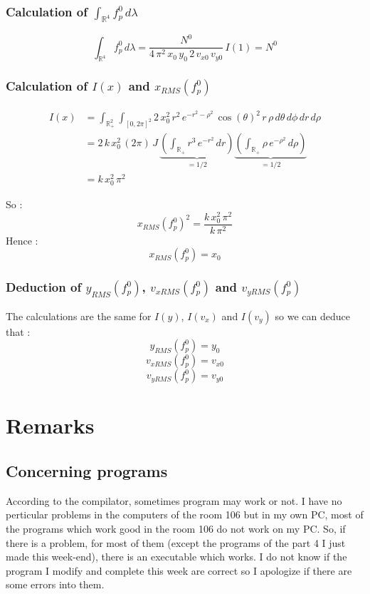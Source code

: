 \documentclass[10pt]{article}
\begin{document}
\subsubsection{Calculation of $\int_{\mathbb{R}^4}f_p^0\,d\lambda$}

$$\boxed{\int_{\mathbb{R}^4}f_p^0\,d\lambda = \frac{N^0}{4\,\pi^{2}\,x_0\,y_0\,2\,v_{x0}\,v_{y0}}\,I(1) = N^0}$$

\subsubsection{Calculation of $I(x)$ and $x_{RMS}(f_p^0)$}

\begin{align*}
I(x) &= \int_{\mathbb{R}_{+}^2}\int_{[0,2\pi]^2}  2\,x_0^2\,r^2\, e^{-r^2-\rho^{2}}\,\cos(\theta)^2\,r\,\rho\,d\theta\,d\phi\,dr\,d\rho \\
&= 2\,k\,x_0^2\,(2\pi)\,J\,\underbrace{\left(\int_{\mathbb{R}_{+}} r^3\,e^{-r^2}\,dr\right)}_{= 1/2} \underbrace{\left(\int_{\mathbb{R}_{+}}\rho\,e^{-\rho^{2}}\,d\rho \right)}_{= 1/2} \\
&= k\,x_0^2\,\pi^{2}
\end{align*}

So :
$${x_{RMS}(f_p^0)^2 = \frac{k\,x_0^2\,\pi^{2}}{k\,\pi^{2}}}$$
Hence :
$$\boxed{x_{RMS}(f_p^0) = x_0}$$

\subsubsection{Deduction of $y_{RMS}(f_p^0)$, $v_{xRMS}(f_p^0)$ and $v_{yRMS}(f_p^0)$}

The calculations are the same for $I(y)$, $I(v_x)$ and $I(v_y)$ so we can deduce that :
$$\boxed{y_{RMS}(f_p^0) = y_0}$$
$$\boxed{v_{xRMS}(f_p^0) = v_{x0}}$$
$$\boxed{v_{yRMS}(f_p^0) = v_{y0}}$$


\newpage

\section{Remarks}


\subsection{Concerning programs}


According to the compilator, sometimes program may work or not. I have no perticular problems in the computers of the room 106 but in my own PC, most of the programs which work good in the room 106 do not work on my PC. So, if there is a problem, for most of them (except the programs of the part 4 I just made this week-end), there is an executable which works. I do not know if the program I modify and complete this week are correct so I apologize if there are some errors into them.
\end{document}
